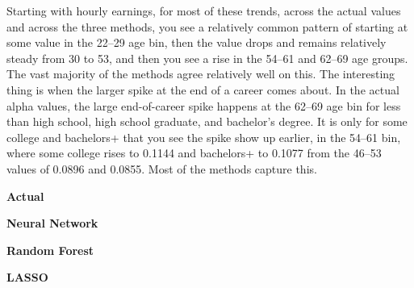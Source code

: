 \documentclass[12pt]{article}
\begin{document}
\begin{onehalfspace}
Starting with hourly earnings, for most of these trends, across the actual values and across the three methods, you see a relatively common pattern of starting at some value in the 22--29 age bin, then the value drops and remains relatively steady from 30 to 53, and then you see a rise in the 54--61 and 62--69 age groups. The vast majority of the methods agree relatively well on this. The interesting thing is when the larger spike at the end of a career comes about. In the actual alpha values, the large end-of-career spike happens at the 62--69 age bin for less than high school, high school graduate, and bachelor's degree. It is only for some college and bachelors+ that you see the spike show up earlier, in the 54--61 bin, where some college rises to 0.1144 and bachelors+ to 0.1077 from the 46--53 values of 0.0896 and 0.0855. Most of the methods capture this.

\begin{table}[H]
    \centering
    \caption{Mean Predicted Alpha by Education and Age Bin, Annual Earnings}
    \label{tab:alpha_fearn_pred_matrix}
    \begin{minipage}[t]{0.48\textwidth}
        \centering
        \textbf{Actual}\\[4pt]
        \resizebox{\linewidth}{!}{%
            
        }
    \end{minipage}\hfill
    \begin{minipage}[t]{0.48\textwidth}
        \centering
        \textbf{Neural Network}\\[4pt]
        \resizebox{\linewidth}{!}{%
            
        }
    \end{minipage}

    \vspace{10pt}

    \begin{minipage}[t]{0.48\textwidth}
        \centering
        \textbf{Random Forest}\\[4pt]
        \resizebox{\linewidth}{!}{%
            
        }
    \end{minipage}\hfill
    \begin{minipage}[t]{0.48\textwidth}
        \centering
        \textbf{LASSO}\\[4pt]
        \resizebox{\linewidth}{!}{%
            
        }
    \end{minipage}
\end{table}


\end{onehalfspace}
\end{document}
